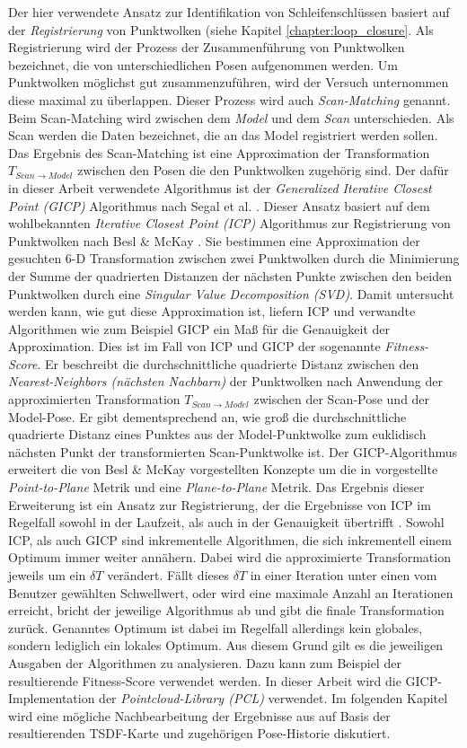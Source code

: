 Der hier verwendete Ansatz zur Identifikation von Schleifenschlüssen basiert auf der \emph{Registrierung} von Punktwolken (siehe Kapitel \ref{chapter:loop_closure}.  Als Registrierung wird der Prozess der Zusammenführung von Punktwolken bezeichnet, die von unterschiedlichen Posen aufgenommen werden. Um Punktwolken möglichst gut zusammenzuführen, wird der Versuch unternommen diese maximal zu überlappen. Dieser Prozess wird auch \emph{Scan-Matching} genannt. Beim Scan-Matching wird zwischen dem \emph{Model} und dem \emph{Scan} unterschieden. Als Scan werden die Daten bezeichnet, die an das Model registriert werden sollen. Das Ergebnis des Scan-Matching ist eine Approximation der Transformation $T_{Scan \rightarrow Model}$ zwischen den Posen die den Punktwolken zugehörig sind. Der dafür in dieser Arbeit verwendete Algorithmus ist der \emph{Generalized Iterative Closest Point (GICP)} Algorithmus nach Segal et al. \cite{segal2009generalized}. Dieser Ansatz basiert auf dem wohlbekannten \emph{Iterative Closest Point (ICP)} Algorithmus zur Registrierung von Punktwolken nach Besl \& McKay \cite{besl1992method}. Sie bestimmen eine Approximation der gesuchten 6-D Transformation zwischen zwei Punktwolken durch die Minimierung der Summe der quadrierten Distanzen der nächsten Punkte zwischen den beiden Punktwolken durch eine \emph{Singular Value Decomposition (SVD)}. Damit untersucht werden kann, wie gut diese Approximation ist, liefern ICP und verwandte Algorithmen wie zum Beispiel GICP ein Maß für die Genauigkeit der Approximation. Dies ist im Fall von ICP und GICP der sogenannte \emph{Fitness-Score}. Er beschreibt die durchschnittliche quadrierte Distanz zwischen den \emph{Nearest-Neighbors (nächsten Nachbarn)} der Punktwolken nach Anwendung der approximierten Transformation $T_{Scan \rightarrow Model}$ zwischen der Scan-Pose und der Model-Pose. Er gibt dementsprechend an, wie groß die durchschnittliche quadrierte Distanz eines Punktes aus der Model-Punktwolke zum euklidisch nächsten Punkt der transformierten Scan-Punktwolke ist. Der GICP-Algorithmus erweitert die von Besl \& McKay \cite{besl1992method} vorgestellten Konzepte um die in \cite{chen1992object} vorgestellte \emph{Point-to-Plane} Metrik und eine \emph{Plane-to-Plane} Metrik. Das Ergebnis dieser Erweiterung ist ein Ansatz zur Registrierung, der die Ergebnisse von ICP im Regelfall sowohl in der Laufzeit, als auch in der Genauigkeit übertrifft \cite{segal2009generalized}. Sowohl ICP, als auch GICP sind inkrementelle Algorithmen, die sich inkrementell einem Optimum immer weiter annähern. Dabei wird die approximierte Transformation jeweils um ein $\delta T$ verändert. Fällt dieses $\delta T$ in einer Iteration unter einen vom Benutzer gewählten Schwellwert, oder wird eine maximale Anzahl an Iterationen erreicht, bricht der jeweilige Algorithmus ab und gibt die finale Transformation zurück. Genanntes Optimum ist dabei im Regelfall allerdings kein globales, sondern lediglich ein lokales Optimum. Aus diesem Grund gilt es die jeweiligen Ausgaben der Algorithmen zu analysieren. Dazu kann zum Beispiel der resultierende Fitness-Score verwendet werden. In dieser Arbeit wird die GICP-Implementation der \emph{Pointcloud-Library (PCL)} \cite{rusu20113d} verwendet. Im folgenden Kapitel wird eine mögliche Nachbearbeitung der Ergebnisse aus \citep{HATSDF} auf Basis der resultierenden TSDF-Karte und zugehörigen Pose-Historie diskutiert.